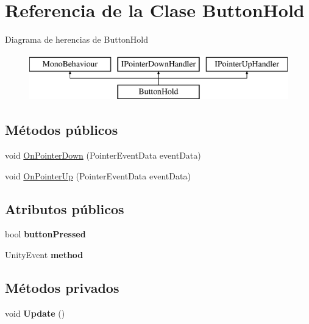 \hypertarget{class_button_hold}{}\section{Referencia de la Clase Button\+Hold}
\label{class_button_hold}
Diagrama de herencias de Button\+Hold\begin{figure}[H]
\begin{center}
\leavevmode
\includegraphics[height=2.000000cm]{class_button_hold}
\end{center}
\end{figure}
\subsection*{Métodos públicos}
\begin{DoxyCompactItemize}
\item 
void \mbox{\hyperlink{class_button_hold_a2e1f8ebf88714ea3e86261ef811c9941}{On\+Pointer\+Down}} (Pointer\+Event\+Data event\+Data)
\item 
void \mbox{\hyperlink{class_button_hold_a2512c68bf1ec55d4bae22da5ef7ed66a}{On\+Pointer\+Up}} (Pointer\+Event\+Data event\+Data)
\end{DoxyCompactItemize}
\subsection*{Atributos públicos}
\begin{DoxyCompactItemize}
\item 
\mbox{\label{class_button_hold_a9855cab98cfb77aee35a1cf117be20ef}} 
bool {\bfseries button\+Pressed}
\item 
\mbox{\label{class_button_hold_a45f8cc4d6c22a20d71717b00d3087fd4}} 
Unity\+Event {\bfseries method}
\end{DoxyCompactItemize}
\subsection*{Métodos privados}
\begin{DoxyCompactItemize}
\item 
\mbox{\label{class_button_hold_ae908d18846152daca9782466469ea79d}} 
void {\bfseries Update} ()
\end{DoxyCompactItemize}


